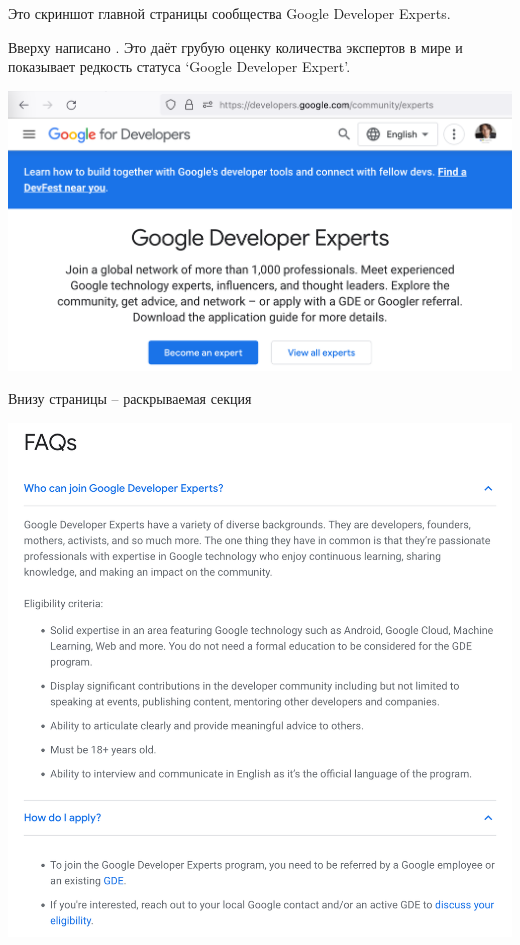 
Это скриншот главной страницы сообщества Google Developer Experts.

Вверху написано .
Это даёт грубую оценку количества экспертов в мире
и показывает редкость статуса `Google Developer Expert'.

\includegraphics[width=\textwidth]{home-p1}
\WillContinue

\pagebreak

Внизу страницы -- раскрываемая секция 

\Continuing
\includegraphics[width=\textwidth]{home-bottom}

